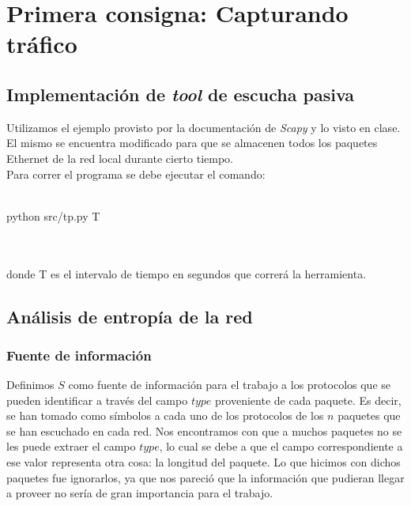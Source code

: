 \section{Primera consigna: Capturando tráfico}

\subsection{Implementación de \emph{tool} de escucha pasiva}
Utilizamos el ejemplo provisto por la documentación de \emph{Scapy} y lo visto en clase. 
El mismo se encuentra modificado para que se almacenen todos los paquetes Ethernet de la red local durante cierto tiempo. \\

Para correr el programa se debe ejecutar el comando: \\ \\ \centerline{python src/tp.py T} \\ \\ donde T es el intervalo de tiempo en segundos 
que correrá la herramienta.

\subsection{Análisis de entropía de la red}

\subsubsection{Fuente de información}
Definimos $S$ como fuente de información para el trabajo a los protocolos que se pueden identificar a través del campo $type$ 
proveniente de cada paquete. Es decir, se han tomado como símbolos a cada uno de los protocolos de los $n$ paquetes que se han escuchado en cada red. Nos encontramos con que a muchos paquetes no se les puede extraer el campo $type$, lo cual se debe a que
el campo correspondiente a ese valor representa otra cosa: la longitud del paquete. Lo que hicimos con dichos paquetes fue
ignorarlos, ya que nos pareció que la información que pudieran llegar a proveer no sería de gran importancia para el trabajo. \\


